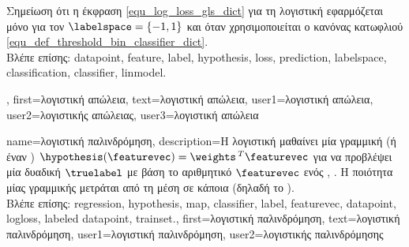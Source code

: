 {{\begin{figure}[H]
\begin{center}
{			\label{fig_logloss_dict} }
		\end{center}
		\end{figure}
		\foreignlanguage{greek}{Σημείωση ότι η έκφραση} \eqref{equ_log_loss_gls_dict} 
		\foreignlanguage{greek}{για τη λογιστική}  \foreignlanguage{greek}{εφαρμόζεται μόνο 
		για τον}  $\labelspace = \{ -1,1\}$ 
		\foreignlanguage{greek}{και όταν χρησιμοποιείται ο κανόνας κατωφλιού} \eqref{equ_def_threshold_bin_classifier_dict}. 
		\\
		\foreignlanguage{greek}{Βλέπε επίσης:} \gls{datapoint}, \gls{feature}, \gls{label}, \gls{hypothesis}, 
		\gls{loss}, \gls{prediction}, \gls{labelspace}, \gls{classification}, \gls{classifier}, \gls{linmodel}.},
	first={\foreignlanguage{greek}{λογιστική απώλεια}},
	text={\foreignlanguage{greek}{λογιστική απώλεια}},
	user1={\foreignlanguage{greek}{λογιστική απώλεια}}, %
	user2={\foreignlanguage{greek}{λογιστικής απώλειας}}, %
	user3={\foreignlanguage{greek}{λογιστική απώλεια}} %
}

{name={\foreignlanguage{greek}{λογιστική παλινδρόμηση}}, 
	description={\foreignlanguage{greek}{Η λογιστική} 
		 \foreignlanguage{greek}{μαθαίνει μία γραμμική} 
		  (\foreignlanguage{greek}{ή έναν}  
		) $\hypothesis(\featurevec) = \weights\,^{T} \featurevec$ 
		\foreignlanguage{greek}{για να προβλέψει μία δυαδική}  $\truelabel$ 
		\foreignlanguage{greek}{με βάση το αριθμητικό}  $\featurevec$ 
		\foreignlanguage{greek}{ενός}  \cite{BishopBook}, \cite{hastie01statisticallearning}. 
		\foreignlanguage{greek}{Η ποιότητα μίας γραμμικής}   
		\foreignlanguage{greek}{μετράται από τη μέση}  \foreignlanguage{greek}{σε κάποια}
		 (\foreignlanguage{greek}{δηλαδή το} ).
		\\
		\foreignlanguage{greek}{Βλέπε επίσης:} \gls{regression}, \gls{hypothesis}, \gls{map}, \gls{classifier}, \gls{label}, \gls{featurevec}, 
		\gls{datapoint}, \gls{logloss}, \gls{labeled datapoint}, \gls{trainset}.},
	first={\foreignlanguage{greek}{λογιστική παλινδρόμηση}},
	text={\foreignlanguage{greek}{λογιστική παλινδρόμηση}},
	user1={\foreignlanguage{greek}{λογιστική παλινδρόμηση}}, %
	user2={\foreignlanguage{greek}{λογιστικής παλινδρόμησης}} %
}

